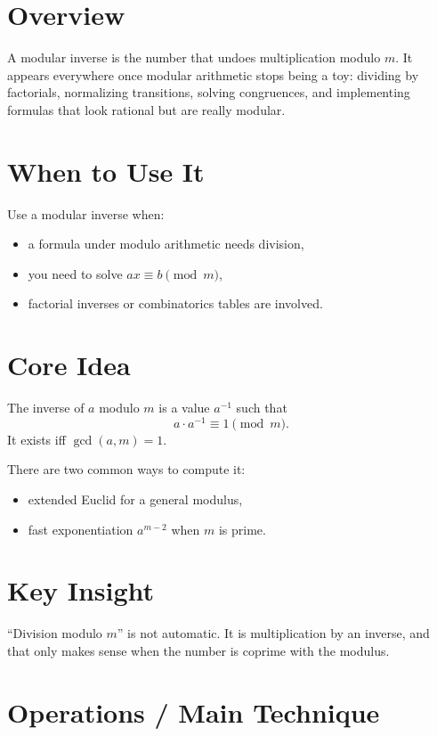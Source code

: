 \section*{Overview}

A modular inverse is the number that undoes multiplication modulo \(m\). It appears everywhere once modular arithmetic
stops being a toy: dividing by factorials, normalizing transitions, solving congruences, and implementing formulas that
look rational but are really modular.

\section*{When to Use It}

Use a modular inverse when:

\begin{itemize}
  \item a formula under modulo arithmetic needs division,
  \item you need to solve \(ax \equiv b \pmod m\),
  \item factorial inverses or combinatorics tables are involved.
\end{itemize}

\section*{Core Idea}

The inverse of \(a\) modulo \(m\) is a value \(a^{-1}\) such that
\[
a \cdot a^{-1} \equiv 1 \pmod m.
\]
It exists iff \(\gcd(a, m) = 1\).

There are two common ways to compute it:
\begin{itemize}
  \item extended Euclid for a general modulus,
  \item fast exponentiation \(a^{m-2}\) when \(m\) is prime.
\end{itemize}

\section*{Key Insight}

``Division modulo \(m\)'' is not automatic. It is multiplication by an inverse, and that only makes sense when the
number is coprime with the modulus.

\section*{Operations / Main Technique}

